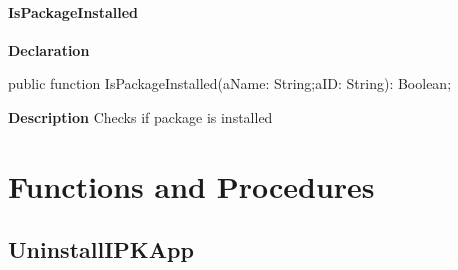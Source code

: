 \documentclass{report}
\newif\ifpdf
\begin{document}
\paragraph*{IsPackageInstalled}\hspace*{\fill}

\label{ipkhandle.TInstallation-IsPackageInstalled}
\begin{list}{}{
\setlength{\itemindent}{0cm}
\setlength{\listparindent}{0cm}
\setlength{\leftmargin}{\evensidemargin}
\addtolength{\leftmargin}{\tmplength}
\settowidth{\labelsep}{X}
\addtolength{\leftmargin}{\labelsep}
\setlength{\labelwidth}{\tmplength}
}
\item[\textbf{Declaration}\hfill]
\ifpdf
\begin{flushleft}
\fi
\begin{ttfamily}
public function IsPackageInstalled(aName: String;aID: String): Boolean;\end{ttfamily}

\ifpdf
\end{flushleft}
\fi

\par
\item[\textbf{Description}]
Checks if package is installed

\end{list}
\section{Functions and Procedures}
\ifpdf
\subsection*{\large{\textbf{UninstallIPKApp}}\normalsize\hspace{1ex}\hrulefill}
\else
\end{document}
